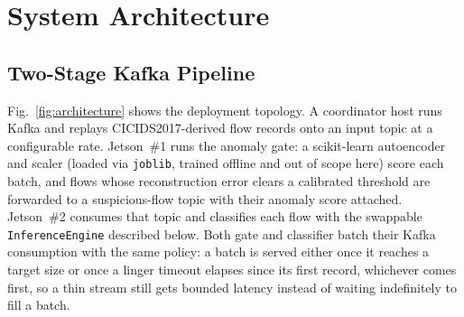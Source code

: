 \documentclass[runningheads]{llncs}
\begin{document}
\section{System Architecture}
\label{sec:arch}

\subsection{Two-Stage Kafka Pipeline}

Fig.~\ref{fig:architecture} shows the deployment topology. A coordinator host runs Kafka and replays CICIDS2017-derived flow records onto an input topic at a configurable rate. Jetson~\#1 runs the anomaly gate: a scikit-learn autoencoder and scaler (loaded via \texttt{joblib}, trained offline and out of scope here) score each batch, and flows whose reconstruction error clears a calibrated threshold are forwarded to a suspicious-flow topic with their anomaly score attached. Jetson~\#2 consumes that topic and classifies each flow with the swappable \texttt{InferenceEngine} described below. Both gate and classifier batch their Kafka consumption with the same policy: a batch is served either once it reaches a target size or once a linger timeout elapses since its first record, whichever comes first, so a thin stream still gets bounded latency instead of waiting indefinitely to fill a batch.
\end{document}
